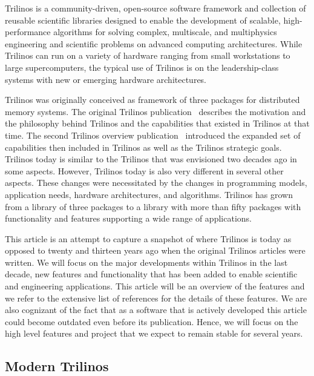 

Trilinos is a community-driven, open-source software framework and collection of reusable scientific libraries designed to enable the development of scalable, high-performance algorithms for solving complex, multiscale, and multiphysics engineering and scientific problems on advanced computing architectures.
While Trilinos can run on a variety of hardware ranging from small workstations to large supercomputers, the typical use of Trilinos is on the leadership-class systems with new or emerging hardware architectures.

Trilinos was originally conceived as framework of three packages for distributed memory systems. The original Trilinos publication~\cite{Heroux2005a} describes the motivation and the philosophy behind Trilinos and the capabilities that existed in Trilinos at that time. The second Trilinos overview publication~\cite{Heroux2012} introduced the expanded set of capabilities then included in Trilinos as well as the Trilinos strategic goals. Trilinos today is similar to the Trilinos that was envisioned two decades ago in some aspects. However, Trilinos today is also very different in several other aspects. These changes were necessitated by the changes in programming models, application needs, hardware architectures, and algorithms. Trilinos has grown from a library of three packages to a library with more than fifty packages with functionality and features supporting a wide range of applications.

This article is an attempt to capture a snapshot of where Trilinos is today as opposed to twenty and thirteen years ago when the original Trilinos articles were written. We will focus on the major developments within Trilinos in the last decade, new features and functionality that has been added to enable scientific and engineering applications. This article will be an overview of the features and we refer to the extensive list of references for the details of these features. We are also cognizant of the fact that as a software that is actively developed this article could become outdated even before its publication. Hence, we will focus on the high level features and project that we expect to remain stable for several years.



\subsection{Modern Trilinos}

